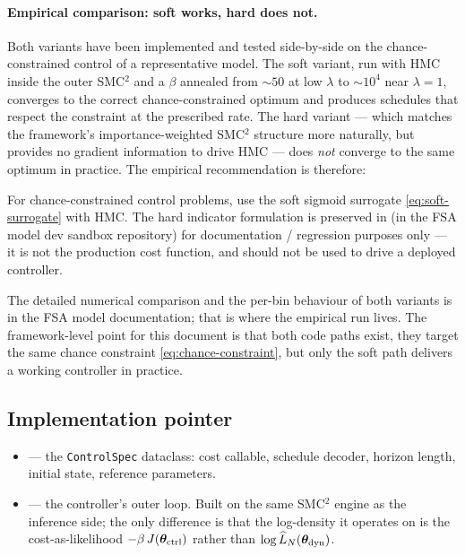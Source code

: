 \paragraph{Empirical comparison: soft works, hard does not.}
Both variants have been implemented and tested side-by-side on the
chance-constrained control of a representative model. The soft
variant, run with HMC inside the outer SMC$^2$ and a $\beta$ annealed
from $\sim 50$ at low $\lambda$ to $\sim 10^4$ near $\lambda = 1$,
converges to the correct chance-constrained optimum and produces
schedules that respect the constraint at the prescribed rate. The
hard variant --- which matches the framework's importance-weighted
SMC$^2$ structure more naturally, but provides no gradient information
to drive HMC --- does \emph{not} converge to the same optimum in
practice. The empirical recommendation is therefore:

\begin{remark}
For chance-constrained control problems, use the soft sigmoid
surrogate \eqref{eq:soft-surrogate} with HMC. The hard indicator
formulation is preserved in
(in the FSA model dev sandbox repository) for documentation /
regression purposes only --- it is not the production cost function,
and should not be used to drive a deployed controller.
\end{remark}

The detailed numerical comparison and the per-bin behaviour
of both variants is in the FSA model documentation; that is where the
empirical run lives. The framework-level point for this document is
that both code paths exist, they target the same chance constraint
\eqref{eq:chance-constraint}, but only the soft path delivers a
working controller in practice.

\subsection{Implementation pointer}

\begin{itemize}
  \item {} --- the
        \texttt{ControlSpec} dataclass: cost callable, schedule
        decoder, horizon length, initial state, reference parameters.
  \item {} --- the controller's
        outer loop. Built on the same SMC$^2$ engine as the inference
        side; the only difference is that the log-density it operates
        on is the cost-as-likelihood
        $-\beta\,J(\bm{\theta}_{\rm ctrl})$ rather than $\log \widehat{L}_N(\bm{\theta}_{\rm dyn})$.
\end{itemize}
